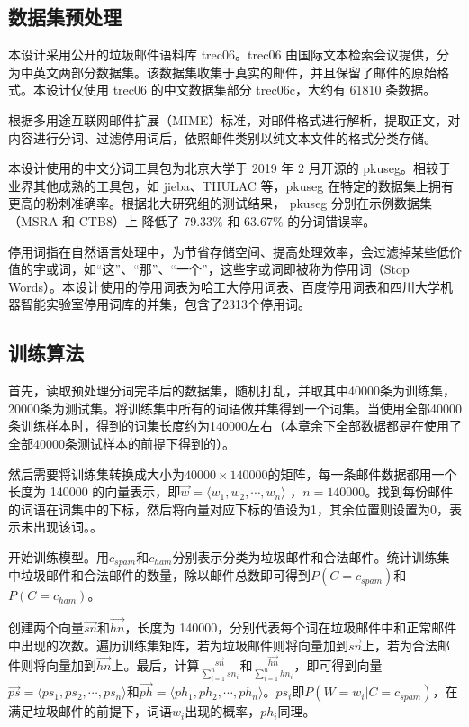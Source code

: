 \documentclass[UTF8,zihao=-4]{ctexart}
\begin{document}
\subsection{数据集预处理}
	本设计采用公开的垃圾邮件语料库  trec06。trec06 由国际文本检索会议提供，分为中英文两部分数据集。该数据集收集于真实的邮件，并且保留了邮件的原始格式。本设计仅使用 trec06 的中文数据集部分 trec06c，大约有 61810 条数据。

	根据多用途互联网邮件扩展（MIME）标准，对邮件格式进行解析，提取正文，对内容进行分词、过滤停用词后，依照邮件类别以纯文本文件的格式分类存储。
		
	本设计使用的中文分词工具包为北京大学于 2019 年 2 月开源的 pkuseg。相较于业界其他成熟的工具包，如 jieba、THULAC 等，pkuseg 在特定的数据集上拥有更高的粉刺准确率。根据北大研究组的测试结果， pkuseg 分别在示例数据集（MSRA 和 CTB8）上
降低了 79.33\% 和 63.67\% 的分词错误率。
	
	停用词指在自然语言处理中，为节省存储空间、提高处理效率，会过滤掉某些低价值的字或词，如“这”、“那”、“一个”，这些字或词即被称为停用词（Stop Words）。本设计使用的停用词表为哈工大停用词表、百度停用词表和四川大学机器智能实验室停用词库的并集，包含了2313个停用词。
\subsection{训练算法}
	首先，读取预处理分词完毕后的数据集，随机打乱，并取其中40000条为训练集，20000条为测试集。将训练集中所有的词语做并集得到一个词集。当使用全部40000条训练样本时，得到的词集长度约为140000左右（本章余下全部数据都是在使用了全部40000条测试样本的前提下得到的）。
	
	然后需要将训练集转换成大小为$40000 \times 140000$的矩阵，每一条邮件数据都用一个长度为 140000 的向量表示，即$\vec{w}=\langle w_1,w_2, \cdots ,w_n\rangle$ ，$n=140000$。找到每份邮件的词语在词集中的下标，然后将向量对应下标的值设为1，其余位置则设置为0，表示未出现该词。。
	
	
	开始训练模型。用$c_{spam}$和$c_{ham}$分别表示分类为垃圾邮件和合法邮件。统计训练集中垃圾邮件和合法邮件的数量，除以邮件总数即可得到$P(C=c_{spam})$和$P(C=c_{ham})$。
	
	创建两个向量$\vec{sn}$和$\vec{hn}$，长度为 140000，分别代表每个词在垃圾邮件中和正常邮件中出现的次数。遍历训练集矩阵，若为垃圾邮件则将向量加到$\vec{sn}$上，若为合法邮件则将向量加到$\vec{hn}$上。最后，计算$\frac{\vec{sn}}{\sum_{i=1}^{n}sn_i}$和$\frac{\vec{hn}}{\sum_{i=1}^{n}hn_i}$，即可得到向量$\vec{ps}=\langle ps_1,ps_2,\cdots,ps_n\rangle$和$\vec{ph}=\langle ph_1,ph_2,\cdots,ph_n\rangle$。$ps_i$即$P(W=w_i|C=c_{spam})$，在满足垃圾邮件的前提下，词语$w_i$出现的概率，$ph_i$同理。
	
\end{document}
